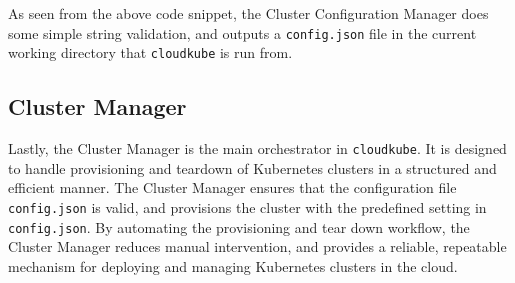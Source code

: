 As seen from the above code snippet, the Cluster Configuration Manager does some simple string validation, and outputs a \texttt{config.json} file in the current working directory that 
\texttt{cloudkube} is run from. 

\subsection{Cluster Manager}
Lastly, the Cluster Manager is the main orchestrator in \texttt{cloudkube}. It is designed to handle provisioning and teardown of Kubernetes clusters in a structured and efficient manner.
The Cluster Manager ensures that the configuration file \texttt{config.json} is valid, and provisions the cluster with the predefined setting in \texttt{config.json}. By automating the provisioning and 
tear down workflow, the Cluster Manager reduces manual intervention, and provides a reliable, repeatable mechanism for deploying and managing Kubernetes clusters in the cloud. 

